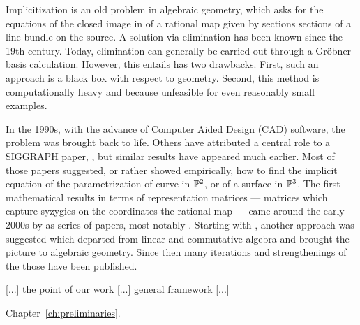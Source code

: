 \documentclass[fleqn,reqno]{amsart}
\begin{document}



Implicitization is an old problem in algebraic geometry,
which asks for the equations of the closed image in of a rational map
given by sections sections of a line bundle on the source.
A solution via elimination has been known since the 19th century.
Today, elimination can generally be carried out through a Gr\"obner basis calculation.
However, this entails has two drawbacks.
First, such an approach is a black box with respect to geometry.
Second, this method is computationally heavy and because unfeasible for even reasonably
small examples.

In the 1990s, with the advance of Computer Aided Design (CAD) software,
the problem was brought back to life.
Others have attributed a central role to a SIGGRAPH paper, \citet{SC-95},
but similar results have appeared much earlier.
Most of those papers suggested, or rather showed empirically, how to find the implicit equation 
of the parametrization of curve in $\mathbb{P}^2$, or of a surface in $\mathbb{P}^3$.
The first mathematical results in terms of representation matrices ---
matrices which capture syzygies on the coordinates the rational map ---
came around the early 2000s by as series of papers, most notably \citet{CGZ-00}.
Starting with \citet{BJ-03}, another approach was suggested which departed from
linear and commutative algebra and brought the picture to algebraic geometry.
Since then many iterations and strengthenings of the those have been published.

[...] the point of our work [...] general framework [...]

Chapter~\ref{ch:preliminaries}.




\end{document}
